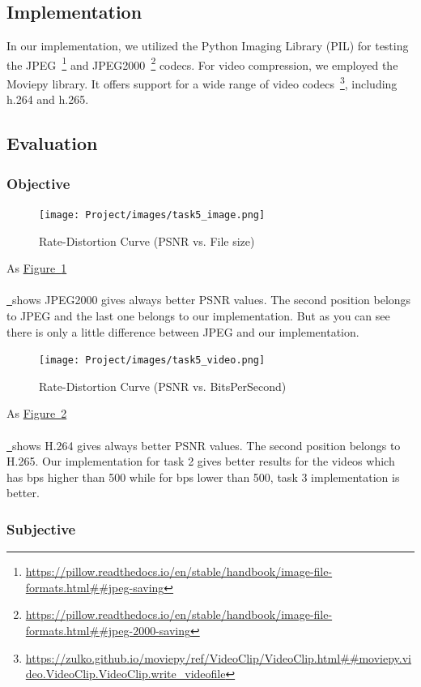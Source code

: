 \documentclass{article}
\newcommand*{\figref}[2][]{%
  \hyperref[{fig:#2}]{%
    Figure~\ref*{fig:#2}%
    \ifx\\#1\\%
    \else
      \,#1%
    \fi
  }%
}
\begin{document}
\subsection{Implementation} 

In our implementation, we utilized the Python Imaging Library (PIL) for testing the JPEG~\footnote{\url{https://pillow.readthedocs.io/en/stable/handbook/image-file-formats.html##jpeg-saving}} and JPEG2000~\footnote{\url{https://pillow.readthedocs.io/en/stable/handbook/image-file-formats.html##jpeg-2000-saving}} codecs. For video compression, we employed the Moviepy library. It offers support for a wide range of video codecs~\footnote{\url{https://zulko.github.io/moviepy/ref/VideoClip/VideoClip.html##moviepy.video.VideoClip.VideoClip.write_videofile}}, including h.264 and h.265.


\subsection{Evaluation}
\subsubsection{Objective}

\begin{figure}[H]
  \centering
  \texttt{[image: Project/images/task5\_image.png]}
  \caption{Rate-Distortion Curve (PSNR vs. File size)}
  \label{fig:task5img}
\end{figure}

As \figref{task5img} shows JPEG2000 gives always better PSNR values. The second position belongs to JPEG and the last one belongs to our implementation. But as you can see there is only a little difference between JPEG and our implementation.


\begin{figure}[H]
  \centering
  \texttt{[image: Project/images/task5\_video.png]}
  \caption{Rate-Distortion Curve (PSNR vs. BitsPerSecond)}
  \label{fig:task5vid}
\end{figure}

As \figref{task5vid} shows H.264 gives always better PSNR values. The second position belongs to H.265. Our implementation for task 2 gives better results for the videos which has bps higher than 500 while for bps lower than 500, task 3 implementation is better.

\subsubsection{Subjective}
\end{document}
